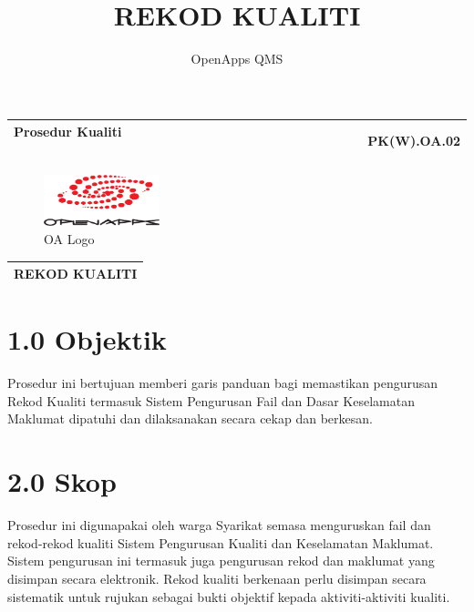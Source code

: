 \documentclass[
]{article}
\title{REKOD KUALITI}
\author{OpenApps QMS}
\date{}
\begin{document}
\maketitle

{
\setcounter{tocdepth}{4}
\tableofcontents
}
\newpage

\begin{longtable}[]{@{}lr@{}}
\toprule
\begin{minipage}[b]{0.66\columnwidth}\raggedright
Prosedur Kualiti ~ ~ ~ ~ ~ ~ ~ ~ ~ ~~ ~ ~ ~ ~ ~ ~ ~ ~ ~~ ~ ~ ~ ~ ~ ~ ~ ~
~~ ~ ~ ~ ~ ~ ~ ~ ~ ~\strut
\end{minipage} & \begin{minipage}[b]{0.28\columnwidth}\raggedleft
PK(W).OA.02\strut
\end{minipage}\tabularnewline
\midrule
\endhead
\bottomrule
\end{longtable}

\begin{figure}
\centering
\includegraphics[width=0.3\textwidth,height=\textheight]{media/openapps-logo.png}
\caption{OA Logo}
\end{figure}

\begin{longtable}[]{@{}c@{}}
\toprule
\endhead
REKOD KUALITI\tabularnewline
\bottomrule
\end{longtable}

\hypertarget{objektik}{%
\section{1.0 Objektik}\label{objektik}}

Prosedur ini bertujuan memberi garis panduan bagi memastikan pengurusan
Rekod Kualiti termasuk Sistem Pengurusan Fail dan Dasar Keselamatan
Maklumat dipatuhi dan dilaksanakan secara cekap dan berkesan.

\hypertarget{skop}{%
\section{2.0 Skop}\label{skop}}

Prosedur ini digunapakai oleh warga Syarikat semasa menguruskan fail dan
rekod-rekod kualiti Sistem Pengurusan Kualiti dan Keselamatan Maklumat.
Sistem pengurusan ini termasuk juga pengurusan rekod dan maklumat yang
disimpan secara elektronik. Rekod kualiti berkenaan perlu disimpan
secara sistematik untuk rujukan sebagai bukti objektif kepada
aktiviti-aktiviti kualiti.
\end{document}

